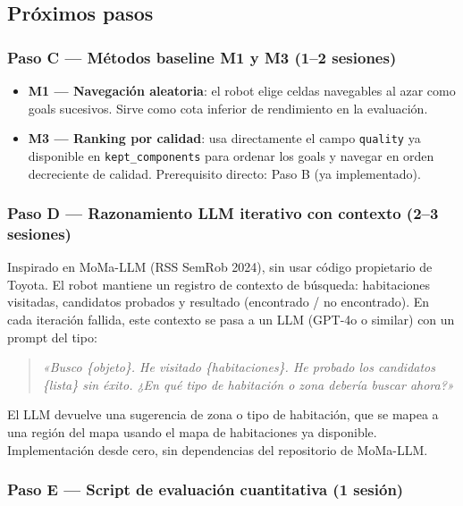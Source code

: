 \documentclass[11pt,a4paper]{article}
\begin{document}
\subsection{Próximos pasos}

\subsubsection*{Paso C — Métodos baseline M1 y M3 (1--2 sesiones)}

\begin{itemize}
  \item \textbf{M1 — Navegación aleatoria}: el robot elige celdas navegables al azar
        como goals sucesivos. Sirve como cota inferior de rendimiento en la evaluación.
  \item \textbf{M3 — Ranking por calidad}: usa directamente el campo \texttt{quality}
        ya disponible en \texttt{kept\_components} para ordenar los goals y navegar
        en orden decreciente de calidad. Prerequisito directo: Paso B (ya implementado).
\end{itemize}

\subsubsection*{Paso D --- Razonamiento LLM iterativo con contexto (2--3 sesiones)}

Inspirado en MoMa-LLM (RSS SemRob 2024), sin usar código propietario de Toyota.
El robot mantiene un registro de contexto de búsqueda: habitaciones visitadas,
candidatos probados y resultado (encontrado / no encontrado). En cada iteración
fallida, este contexto se pasa a un LLM (GPT-4o o similar) con un prompt del tipo:

\begin{quote}
\textit{«Busco \{objeto\}. He visitado \{habitaciones\}. He probado los candidatos
\{lista\} sin éxito. ¿En qué tipo de habitación o zona debería buscar ahora?»}
\end{quote}

El LLM devuelve una sugerencia de zona o tipo de habitación, que se mapea a una
región del mapa usando el mapa de habitaciones ya disponible. Implementación desde
cero, sin dependencias del repositorio de MoMa-LLM.

\subsubsection*{Paso E --- Script de evaluación cuantitativa (1 sesión)}
\end{document}
